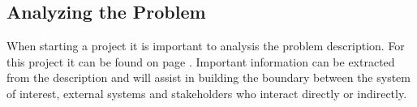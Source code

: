 \subsection{Analyzing the Problem}
When starting a project it is important to analysis the problem description. For this project it can be found on page \pageref{sc:problemdescription}. Important information can be extracted from the description and will assist in building the boundary between the system of interest, external systems and stakeholders who interact directly or indirectly.